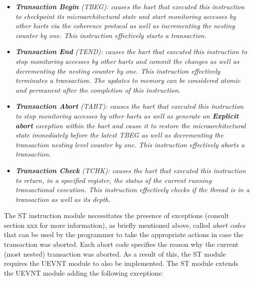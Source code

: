         \begin{itemize}

            \item \textit{\textbf{Transaction Begin} (TBEG): causes the hart that executed this instruction to checkpoint its microarchitectural state and start monitoring accesses by other harts via the coherence protocol as well as incrementing the nesting counter by one. This instruction effectively starts a transaction.}

            \item \textit{\textbf{Transaction End} (TEND): causes the hart that executed this instruction to stop monitoring accesses by other harts and commit the changes as well as decrementing the nesting counter by one. This instruction effectively terminates a transaction. The updates to memory can be considered atomic and permanent after the completion of this instruction.}

            \item \textit{\textbf{Transaction Abort} (TABT): causes the hart that executed this instruction to stop monitoring accesses by other harts as well as generate an \textbf{Explicit abort} exception within the hart and cause it to restore the microarchitectural state immediately before the latest TBEG as well as decrementing the transaction nesting level counter by one. This instruction effectively aborts a transaction.}

            \item \textit{\textbf{Transaction Check} (TCHK): causes the hart that executed this instruction to return, in a specified register, the status of the current running transactional execution. This instruction effectively checks if the thread is in a transaction as well as its depth.}

        \end{itemize}

        The ST instruction module necessitates the presence of exceptions (consult section xxx for more information), as briefly mentioned above, called \textit{abort codes} that can be used by the programmer to take the appropriate actions in case the transaction was aborted. Each abort code specifies the reason why the current (most nested) transaction was aborted. As a result of this, the ST module requires the UEVNT module to also be implemented. The ST module extends the UEVNT module adding the following exceptions:

